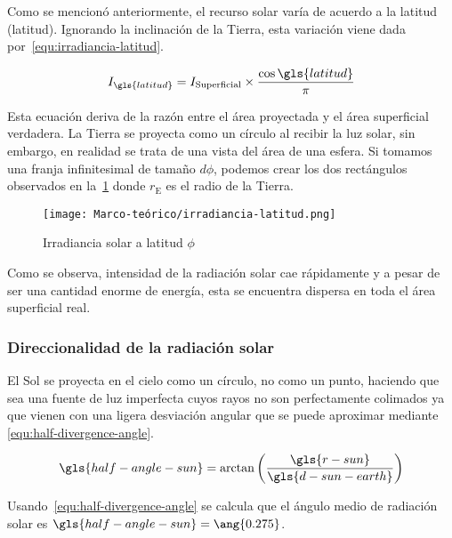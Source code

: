 			Como se mencionó anteriormente, el recurso solar varía de acuerdo a la latitud (\gls{latitud}). Ignorando la inclinación de la Tierra, esta variación viene dada por~\eqref{equ:irradiancia-latitud}.
			
			\begin{equation}
				\label{equ:irradiancia-latitud}
				I_{\gls{latitud}} = I_{\text{Superficial}} \times \dfrac{\cos{\gls{latitud}}}{\pi}
			\end{equation}
			
			Esta ecuación deriva de la razón entre el área proyectada y el área superficial verdadera. La Tierra se proyecta como un círculo al recibir la luz solar, sin embargo, en realidad se trata de una vista del área de una esfera. Si tomamos una franja infinitesimal de tamaño $d\phi$, podemos crear los dos rectángulos observados en la~\cref{fig:irradiancia-latitud} donde $r_{\text{E}} $ es el radio de la Tierra.
			
			\begin{figure}
				\centering
				\texttt{[image: Marco-teórico/irradiancia-latitud.png]}
				\caption{Irradiancia solar a latitud $\phi$}
				\label{fig:irradiancia-latitud}
			\end{figure}
			
			Como se observa, intensidad de la radiación solar cae rápidamente y a pesar de ser una cantidad enorme de energía, esta se encuentra dispersa en toda el área superficial real.
		
		\subsubsection{Direccionalidad de la radiación solar}
			
			El Sol se proyecta en el cielo como un círculo, no como un punto, haciendo que sea una fuente de luz imperfecta cuyos rayos no son perfectamente colimados ya que vienen con una ligera desviación angular que se puede aproximar mediante \eqref{equ:half-divergence-angle}.
			
			\begin{equation}\label{equ:half-divergence-angle}
				\gls{half-angle-sun} = \arctan\left(\dfrac{\gls{r-sun}}{\gls{d-sun-earth}}\right)
			\end{equation}
			
			Usando~\eqref{equ:half-divergence-angle} se calcula que el ángulo medio de radiación solar es $\gls{half-angle-sun} = \ang{0.275}$.
		
